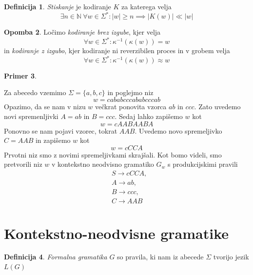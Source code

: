 \documentclass{amsart}
\newcommand{\N}{\mathbb{N}}
\theoremstyle{definition} %
\newtheorem{definicija}{Definicija}[section]
\newtheorem{primer}[definicija]{Primer}
\newtheorem{opomba}[definicija]{Opomba}
\theoremstyle{plain} %
\begin{document}
\begin{definicija}
    
    \textit{Stiskanje} je kodiranje $ K $ za katerega velja 
    \[ 
    \exists n \in \N \ \forall w \in \Sigma^* \colon |w| \geq n \implies
    \left\lvert K(w)\right\rvert \ll \left\lvert w \right\rvert
    \]

\end{definicija}

\begin{opomba}
    
    Ločimo \textit{kodiranje brez izgube}, kjer velja
    \[
        \forall w \in \Sigma^* \colon \kappa^{-1}(\kappa(w)) = w
    \]
    in \textit{kodiranje z izgubo}, kjer kodiranje ni reverzibilen proces
    in v grobem velja
    \[
        \forall w \in \Sigma^* \colon \kappa^{-1}(\kappa(w)) \approx w
    \]

\end{opomba}

\begin{primer}\label{Stiskanje}
    
    Za abecedo vzemimo $ \Sigma = \{ a,b,c \} $ in poglejmo niz
    \[
        w = cababcccababcccab
    \]
    Opazimo, da se nam v nizu $ w $ večkrat ponovita vzorca $ ab $ in $ ccc $. Zato
    uvedemo novi spremenljivki $ A = ab $ in $ B = ccc $. Sedaj lahko zapišemo $ w $ kot
    \[
        w = cAABAABA
    \]
    Ponovno se nam pojavi vzorec, tokrat $ AAB $. Uvedemo novo spremeljivko $ C = AAB $
    in zapišemo $ w $ kot
    \[
        w = cCCA
    \]
    Prvotni niz smo z novimi spremeljivkami skrajšali. Kot bomo videli, smo
    pretvorili niz $ w $ v kontekstno neodvisno gramatiko $ G_w $ s
    produkcijskimi pravili
    \begin{align*}
        & S  \rightarrow  cCCA, \\
        & A  \rightarrow  ab, \\
        & B  \rightarrow  ccc, \\
        & C  \rightarrow  AAB
    \end{align*}

\end{primer}

\section{Kontekstno-neodvisne gramatike}

\begin{definicija}

    \textit{Formalna gramatika} $ G $ so pravila, ki nam iz abecede $ \Sigma $ tvorijo jezik
    $ L(G) $

\end{definicija}
\end{document}
